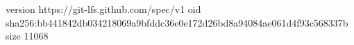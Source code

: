 version https://git-lfs.github.com/spec/v1
oid sha256:bb441842db034218069a9bfddc36e0e172d26bd8a94084ae061d4f93c568337b
size 11068
